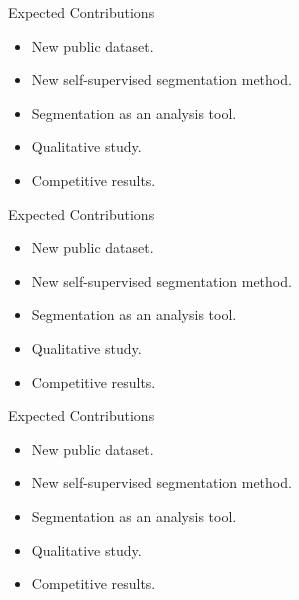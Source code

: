 \begin{frame}{Expected Contributions}
    \begin{itemize}
        \item New public dataset.
        \item New self-supervised segmentation method.
        \item Segmentation as an analysis tool.
        \item Qualitative study.
        \item Competitive results.
    \end{itemize}
\end{frame}
\begin{frame}{Expected Contributions}
    \begin{itemize}
        \item New public dataset.
        \item New self-supervised segmentation method.
        \item Segmentation as an analysis tool.
        \item Qualitative study.
        \item Competitive results.
    \end{itemize}
\end{frame}
\begin{frame}{Expected Contributions}
    \begin{itemize}
        \item New public dataset.
        \item New self-supervised segmentation method.
        \item Segmentation as an analysis tool.
        \item Qualitative study.
        \item Competitive results.
    \end{itemize}
\end{frame}
